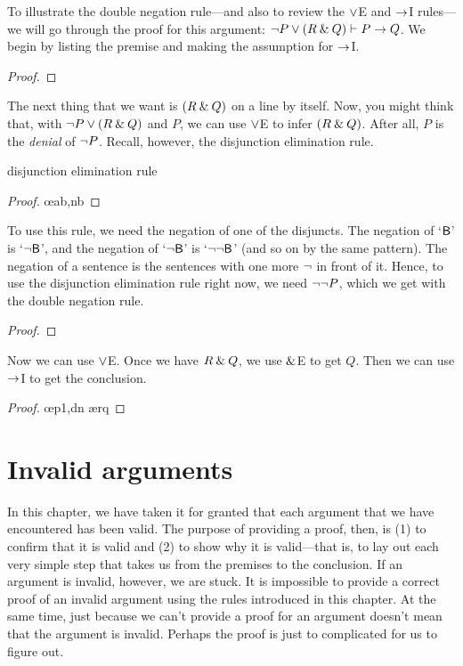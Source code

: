 To illustrate the double negation rule---and also to review the $\vee$E and $\rightarrow$I rules---we will go through the proof for this argument: ${\neg} P \vee (R \mathbin{\&} Q) \vdash P \rightarrow Q$. We begin by listing the premise and making the assumption for $\rightarrow$I.

\begin{proof}
	 \pr{}	
	\open
		\as{}
\end{proof}
The next thing that we want is $(R \mathbin{\&} Q)$ on a line by itself. Now, you might think that, with ${\neg} P \vee (R \mathbin{\&} Q)$ and $P$, we can use $\vee$E to infer $(R \mathbin{\&} Q)$. After all, $P$ is the \textit{denial} of ${\neg} P$. Recall, however, the disjunction elimination rule.
\begin{factboxy}{disjunction elimination rule}
\begin{proof}
	 \oe{ab,nb}
\end{proof}
\end{factboxy}  
\noindent To use this rule, we need the negation of one of the disjuncts. The negation of `$\mathsf{B}$' is `${\neg}\mathsf{B}$', and the negation of 
`${\neg}\mathsf{B}$' is `${\neg}{\neg}\mathsf{B}$' (and so on by the same pattern). The negation of a sentence is the sentences with one more ${\neg}$ in front of it. Hence, to use the disjunction elimination rule right now, we need ${\neg}{\neg} P$, which we get with the double negation rule.

\begin{proof}
	 \pr{}	
	\open
		\as{}
		 
\end{proof}
Now we can use $\vee$E. Once we have $R \mathbin{\&} Q$, we use $\mathbin{\&}$E to get $Q$. Then we  can use $\rightarrow$I to get the conclusion.

\begin{proof}
	 \pr{}	
	\open
		\as{}
		 
		 \oe{p1,dn}
		 \ae{rq}
	\close
\end{proof}



\section{Invalid arguments}

In this chapter, we have taken it for granted that each argument that we have encountered has been valid. The purpose of providing a proof, then, is (1) to confirm that it is valid and (2) to show why it is valid---that is, to lay out each very simple step that takes us from the premises to the conclusion. If an argument is invalid, however, we are stuck. It is impossible to provide a correct proof of an invalid argument using the rules introduced in this chapter. At the same time, just because we can't provide a proof for an argument doesn't mean that the argument is invalid. Perhaps the proof is just to complicated for us to figure out. 

